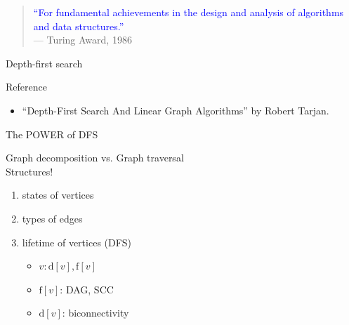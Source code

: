 
\begin{frame}{}
  \begin{columns}
  \end{columns}

  \vspace{0.50cm}
  \begin{quote}
    \textcolor{blue}{``For fundamental achievements in the design and analysis of algorithms and data structures.''} \\
    \hfill --- Turing Award, 1986
  \end{quote}
\end{frame}
\begin{frame}{Depth-first search}


  \begin{alertblock}{Reference}
    \begin{itemize}
      \item ``Depth-First Search And Linear Graph Algorithms'' by Robert Tarjan.
    \end{itemize}
  \end{alertblock}
\end{frame}
\begin{frame}{The POWER of DFS} 
  \begin{center}
	Graph decomposition vs. Graph traversal \\[10pt]
	Structures!
  \end{center}

  \pause
  \begin{enumerate}
	\item states of vertices
	\item types of edges
	\item lifetime of vertices (DFS)
	  \begin{itemize}
	    \item $v: \text{d}[v], \text{f}[v]$
	    \item $\text{f}[v]$: DAG, SCC
	    \item $\text{d}[v]$: biconnectivity
	  \end{itemize}
  \end{enumerate}
\end{frame}

